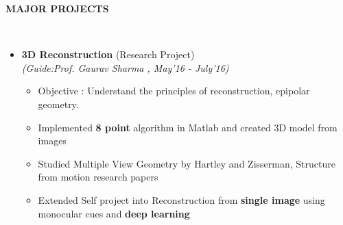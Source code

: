 \documentclass[a4paper,10pt]{article}
\newcommand{\isep}{-2 pt}
\newcommand{\lsep}{-0.5cm}
\newcommand{\resheading}[1]{{\small \colorbox{mygrey}{\begin{minipage}{0.975\textwidth}{\textbf{#1 \vphantom{p\^{E}}}}\end{minipage}}}}
\begin{document}
\resheading{\textbf{MAJOR PROJECTS} }\\[\lsep]
\begin{itemize}
\item \textbf{3D Reconstruction} (Research Project) \\
 \emph{(Guide:Prof. Gaurav Sharma
, May'16 - July'16)} \\[-0.6cm]
	\begin{itemize}\itemsep \isep
	\item Objective : Understand the principles of reconstruction, epipolar geometry.
	\item Implemented \textbf{8 point} algorithm in Matlab and created 3D model from images
	\item Studied Multiple View Geometry by Hartley and Zisserman, Structure from motion research papers
	\item Extended Self project into Reconstruction from \textbf{single image} using monocular cues and \textbf{deep learning}
	\end{itemize}


\end{itemize}
\end{document}
